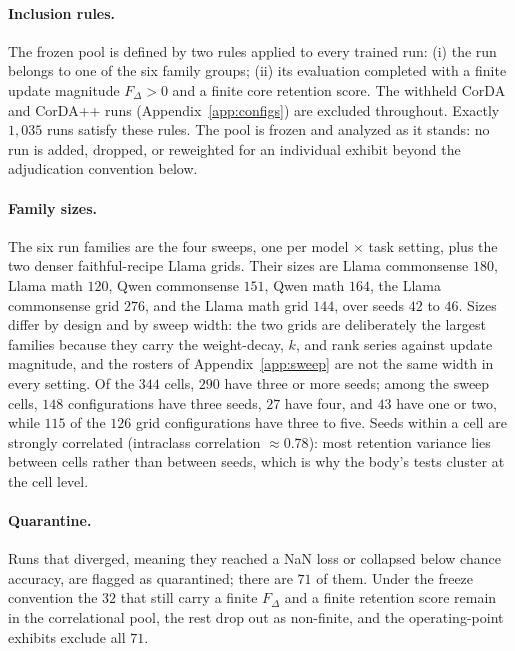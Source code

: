 \documentclass[11pt]{article}
\newcommand{\dw}{F_{\Delta}}
\begin{document}
\paragraph{Inclusion rules.} The frozen pool is defined by two rules applied
to every trained run: (i) the run belongs to one of the six family groups;
(ii) its evaluation completed with a finite update magnitude $\dw > 0$ and a
finite core retention score. The withheld CorDA and CorDA{+}{+} runs
(Appendix~\ref{app:configs}) are excluded throughout. Exactly $1{,}035$ runs
satisfy these rules. The pool is frozen and analyzed as it stands: no run is
added, dropped, or reweighted for an individual exhibit beyond the
adjudication convention below.

\paragraph{Family sizes.} The six run families are the four sweeps, one per
model $\times$ task setting, plus the two denser faithful-recipe Llama grids.
Their sizes are Llama commonsense $180$, Llama math $120$, Qwen commonsense
$151$, Qwen math $164$, the Llama commonsense grid $276$, and the Llama math
grid $144$, over seeds $42$ to $46$. Sizes differ by design and by sweep
width: the two grids are deliberately the largest families because they carry
the weight-decay, $k$, and rank series against update magnitude, and the
rosters of Appendix~\ref{app:sweep} are not the same width in every setting.
Of the $344$ cells, $290$ have three or more seeds; among the sweep cells,
$148$ configurations have three seeds, $27$ have four, and $43$ have one or
two, while $115$ of the $126$ grid configurations have three to five. Seeds
within a cell are strongly correlated (intraclass correlation
$\approx 0.78$): most retention variance lies between cells rather than
between seeds, which is why the body's tests cluster at the cell level.

\paragraph{Quarantine.} Runs that diverged, meaning they reached a NaN loss or
collapsed below chance accuracy, are flagged as quarantined; there are $71$ of
them. Under the freeze convention the $32$ that still carry a finite $\dw$ and
a finite retention score remain in the correlational pool, the rest drop out
as non-finite, and the operating-point exhibits exclude all $71$.
\end{document}
